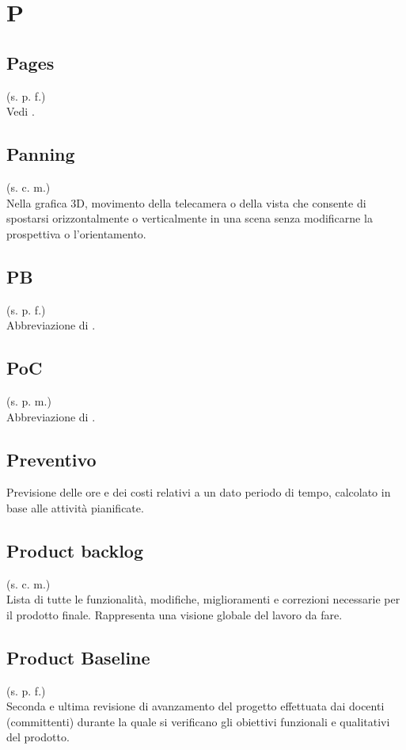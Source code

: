 \section{P}
    \subsection{Pages}
    (s. p. f.)\\
    Vedi .
    \subsection{Panning}
    (s. c. m.)\\
    Nella grafica 3D, movimento della telecamera o della vista che consente 
    di spostarsi orizzontalmente o verticalmente in una scena senza modificarne 
    la prospettiva o l'orientamento.
    \subsection{PB}
    \label{PB}
    (s. p. f.)\\
    Abbreviazione di .
    \subsection{PoC}
    (s. p. m.)\\
    Abbreviazione di .
    \subsection{Preventivo}
    Previsione delle ore e dei costi relativi a un dato periodo di tempo,
    calcolato in base alle attività pianificate.
    \subsection{Product backlog}
    \label{Product backlog}
    (s. c. m.)\\
    Lista di tutte le funzionalità, modifiche, miglioramenti e correzioni necessarie 
    per il prodotto finale. Rappresenta una visione globale del lavoro da fare.
    \subsection{Product Baseline}
    \label{Product Baseline}
    (s. p. f.)\\
    Seconda e ultima revisione di avanzamento del progetto effettuata dai docenti (committenti) 
    durante la quale si verificano gli obiettivi funzionali e qualitativi del prodotto. 
